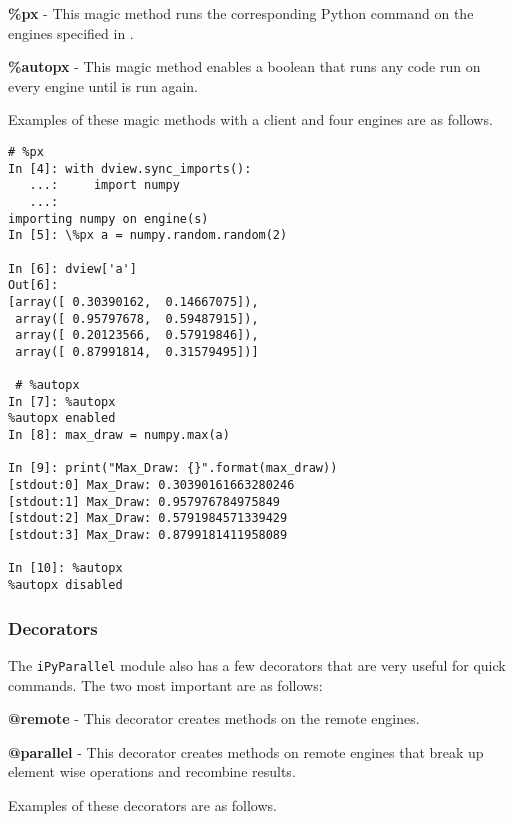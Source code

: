 \begin{list}{}{}
\item \textbf{\%px} - This magic method runs the corresponding Python command on the engines specified in .
\item \textbf{\%autopx} - This magic method enables a boolean that runs any code run on every engine until  is run again.
\end{list}

Examples of these magic methods with a client and four engines are as follows.

\begin{lstlisting}
# %px
In [4]: with dview.sync_imports():
   ...:     import numpy
   ...:
importing numpy on engine(s)
In [5]: \%px a = numpy.random.random(2)

In [6]: dview['a']
Out[6]:
[array([ 0.30390162,  0.14667075]),
 array([ 0.95797678,  0.59487915]),
 array([ 0.20123566,  0.57919846]),
 array([ 0.87991814,  0.31579495])]

 # %autopx
In [7]: %autopx
%autopx enabled
In [8]: max_draw = numpy.max(a)

In [9]: print("Max_Draw: {}".format(max_draw))
[stdout:0] Max_Draw: 0.30390161663280246
[stdout:1] Max_Draw: 0.957976784975849
[stdout:2] Max_Draw: 0.5791984571339429
[stdout:3] Max_Draw: 0.8799181411958089

In [10]: %autopx
%autopx disabled
\end{lstlisting}
\subsubsection*{Decorators}
The \texttt{iPyParallel} module also has a few decorators that are very useful for quick commands.
The two most important are as follows:

\begin{list}{}{}
\item \textbf{@remote} - This decorator creates methods on the remote engines.
\item \textbf{@parallel} - This decorator creates methods on remote engines that break up element wise operations and recombine results.
\end{list}

Examples of these decorators are as follows.

